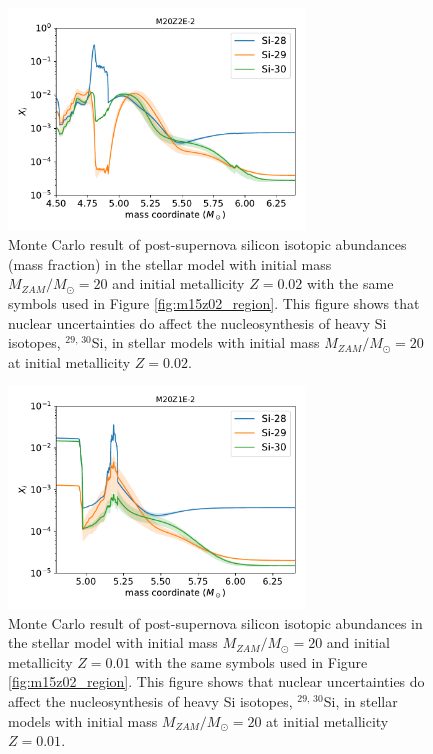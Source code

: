 \documentclass{brandeis-thesis3.2}
\def \msun {M_{\odot}}
\newcommand{\iso}[2]{$^{#1}${#2}}
\begin{document}
\begin{figure}[H]
    \centering
    \includegraphics[width=0.7\textwidth]{figs/M20Z2E-2_mcresult.pdf}
    \caption{Monte Carlo result of post-supernova silicon isotopic abundances (mass fraction) in the stellar model with initial mass $M_{ZAM}/\msun =20$ and initial metallicity $Z=0.02$ with the same symbols used in Figure \ref{fig:m15z02_region}. This figure shows that nuclear uncertainties do affect the nucleosynthesis of heavy Si isotopes, \iso{29,\, 30}{Si}, in stellar models with initial mass $M_{ZAM}/\msun =20$ at initial metallicity $Z=0.02$.}
    \label{fig:m20z02_region}
\end{figure}


\begin{figure}[H]
    \centering
    \includegraphics[width=0.7\textwidth]{figs/M20Z1E-2_mcresult.pdf}
    \caption{Monte Carlo result of post-supernova silicon isotopic abundances in the stellar model with initial mass $M_{ZAM}/\msun =20$ and initial metallicity $Z=0.01$ with the same symbols used in Figure \ref{fig:m15z02_region}. This figure shows that nuclear uncertainties do affect the nucleosynthesis of heavy Si isotopes, \iso{29,\, 30}{Si}, in stellar models with initial mass $M_{ZAM}/\msun =20$ at initial metallicity $Z=0.01$.}
    \label{fig:m20z01_region}
\end{figure}
\end{document}
